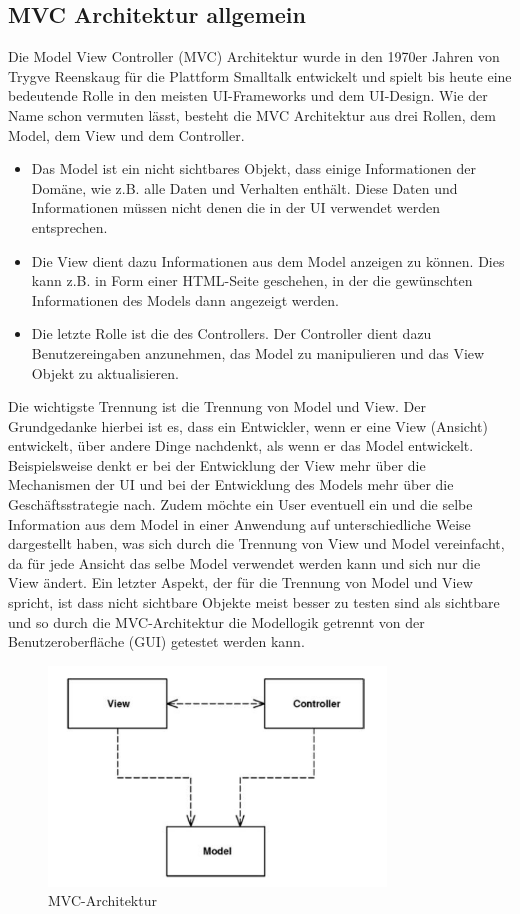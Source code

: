 \subsection{MVC Architektur allgemein}
Die Model View Controller (MVC) Architektur wurde in den 1970er Jahren von Trygve Reenskaug für die Plattform Smalltalk entwickelt und spielt bis heute eine bedeutende Rolle in den meisten UI-Frameworks und dem UI-Design\citep[S. 330]{PEAA2002}.
Wie der Name schon vermuten lässt, besteht die MVC Architektur aus drei Rollen, dem Model, dem View und dem Controller.
\begin{itemize}
\item Das Model ist ein nicht sichtbares Objekt, dass einige Informationen der Domäne, wie z.B. alle Daten und Verhalten enthält. Diese Daten und Informationen müssen nicht denen die in der UI verwendet werden entsprechen\citep[S. 330]{PEAA2002}.

\item Die View dient dazu Informationen aus dem Model anzeigen zu können. Dies kann z.B. in Form einer HTML-Seite geschehen, in der die gewünschten Informationen des Models dann angezeigt werden\citep[S. 330]{PEAA2002}.

\item Die letzte Rolle ist die des Controllers. Der Controller dient dazu Benutzereingaben anzunehmen, das Model zu manipulieren und das View Objekt zu aktualisieren\citep[S. 330f]{PEAA2002}.
\end{itemize}
Die wichtigste Trennung ist die Trennung von Model und View. Der Grundgedanke hierbei ist es, dass ein Entwickler, wenn er eine View (Ansicht) entwickelt, über andere Dinge nachdenkt, als wenn er das Model entwickelt. Beispielsweise denkt er bei der Entwicklung der View mehr über die Mechanismen der UI und bei der Entwicklung des Models mehr über die Geschäftsstrategie nach. Zudem möchte ein User eventuell ein und die selbe Information aus dem Model in einer Anwendung auf unterschiedliche Weise dargestellt haben, was sich durch die Trennung von View und Model vereinfacht, da für jede Ansicht das selbe Model verwendet werden kann und sich nur die View ändert. Ein letzter Aspekt, der für die Trennung von Model und View spricht, ist dass nicht sichtbare Objekte meist besser zu testen sind als sichtbare und so durch die MVC-Architektur die Modellogik getrennt von der Benutzeroberfläche (GUI) getestet werden kann.
\begin{figure}[h]
\centering
\includegraphics[width=0.80\textwidth]{img/MVC-Allgemein(Fowler).png}
\caption {MVC-Architektur}
\end{figure}
